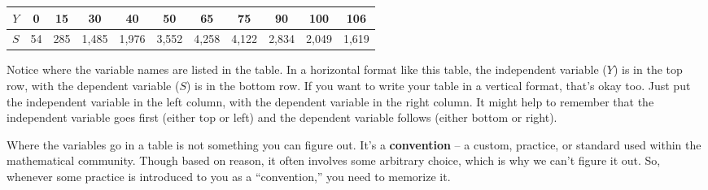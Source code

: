 \begin{center}
\begin{tabular} {|c| |c|c|c|c|c|c|c|c|c|c|} \hline
$Y$ & 0 & 15 & 30 & 40 & 50 & 65 & 75 & 90 & 100 & 106 \\ \hline
$S$ & 54 & 285 & 1,485& 1,976 & 3,552 &  4,258 &  4,122 &  2,834 &  2,049 &  1,619 \\ \hline
\end{tabular}
\end{center}

Notice where the variable names are listed in the table. In a horizontal format like this table, the independent variable ($Y$) is in the top row, with the dependent variable ($S$) is in the bottom row.  If you want to write your table in a vertical format, that's okay too.  Just put the independent variable in the left column, with the dependent variable in the right column. It might help to remember that the independent variable goes first (either top or left) and the dependent variable follows (either bottom or right).  

Where the variables go in a table is not something you can figure out.  It's a \textbf{convention} -- a custom, practice, or standard used within the mathematical community.  Though based on reason, it often involves some arbitrary choice, which is why we can't figure it out.  So, whenever some practice is introduced to you as a ``convention,'' you need to memorize it.  

